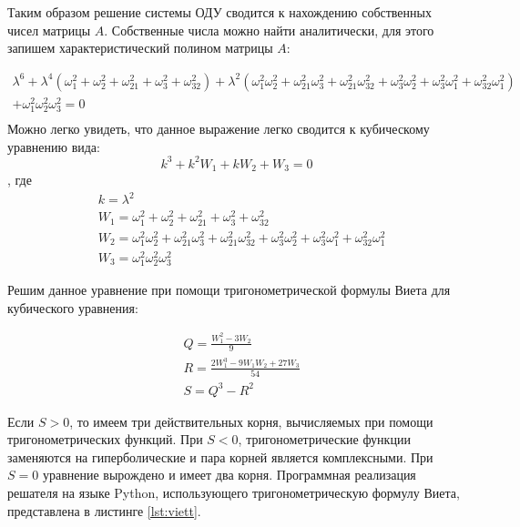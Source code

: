  Таким образом решение системы ОДУ сводится к нахождению собственных чисел матрицы $A$. Собственные числа можно найти аналитически, для этого запишем характеристический полином матрицы $A$:

\begin{multline}
	\lambda^6 + \lambda^4 ( \omega_{1}^2 + \omega_{2}^2 + \omega_{21}^2 + \omega_{3}^2 + \omega_{32}^2 ) + \lambda^2 (\omega_{1}^2 \omega_{2}^2 + \omega_{21}^2 \omega_{3}^2 + \omega_{21}^2\omega_{32}^2 + \omega_{3}^2 \omega_{2}^2 + \omega_{3}^2 \omega_{1}^2 +
	\omega_{32}^2 \omega_{1}^2) \\ + \omega_1^2 \omega_2^2 \omega_3^2 = 0\\
\end{multline} 
 Можно легко увидеть, что данное выражение легко сводится к кубическому уравнению вида:
 \begin{equation}
 	k^3 + k^2 W_1 + k W_2 + W_3 = 0 
 \end{equation}
, где 
 \begin{align}
 	&k = \lambda^2\\
 	&W_1 = \omega_{1}^2 + \omega_{2}^2 + \omega_{21}^2 + \omega_{3}^2 + \omega_{32}^2 \\
 	&W_2 = \omega_{1}^2 \omega_{2}^2 + \omega_{21}^2 \omega_{3}^2 + \omega_{21}^2\omega_{32}^2 + \omega_{3}^2 \omega_{2}^2 + \omega_{3}^2 \omega_{1}^2 +
	\omega_{32}^2 \omega_{1}^2\\
	&W_3 =  \omega_1^2 \omega_2^2 \omega_3^2
 \end{align}

Решим данное уравнение при помощи тригонометрической формулы Виета для кубического уравнения:

\begin{align}
	&Q = \frac{W_1^2 - 3 W_2}{9}\\
	&R = \frac{2 W_1^3 - 9 W_1 W_2 + 27 W_3}{54}\\
	&S = Q^3 - R^2
\end{align}

Если $S>0$, то имеем три действительных корня, вычисляемых при помощи тригонометрических функций. При $S<0$, тригонометрические функции заменяются на гиперболические и пара корней является комплексными. При $S=0$ уравнение вырождено и имеет два корня.
Программная реализация решателя на языке Python, использующего тригонометрическую формулу Виета, представлена в листинге \ref{lst:viett}.

